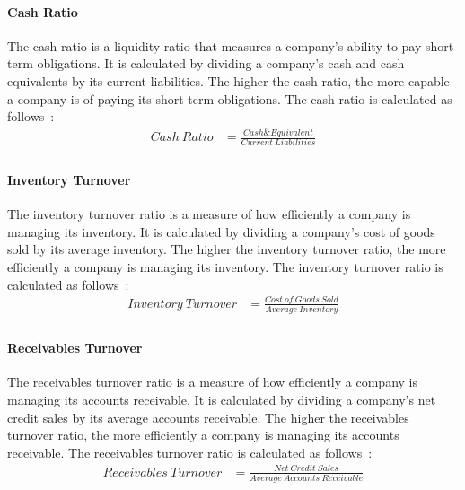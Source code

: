\documentclass[../xlapes02]{subfiles}
\begin{document}
    \paragraph{Cash Ratio}\label{par:cash-ratio}
    The cash ratio is a liquidity ratio that measures a company's ability to pay short-term obligations. It is calculated by dividing a company's cash and cash equivalents by its current liabilities. The higher the cash ratio, the more capable a company is of paying its short-term obligations. The cash ratio is calculated as follows~\cite{investopedia-cash-ratio}:
    \begin{equation}
        \begin{split}
            Cash\ Ratio&=\frac{Cash\&Equivalent}{Current\ Liabilities}\\
        \end{split}
    \end{equation}

    \paragraph{Inventory Turnover}\label{par:inventory-turnover}
    The inventory turnover ratio is a measure of how efficiently a company is managing its inventory. It is calculated by dividing a company's cost of goods sold by its average inventory. The higher the inventory turnover ratio, the more efficiently a company is managing its inventory. The inventory turnover ratio is calculated as follows~\cite{investopedia-inventory-turnover}:
    \begin{equation}
        \begin{split}
            Inventory\ Turnover&=\frac{Cost\ of\ Goods\ Sold}{Average\ Inventory}\\
        \end{split}
    \end{equation}

    \paragraph{Receivables Turnover}\label{par:receivables-turnover}
    The receivables turnover ratio is a measure of how efficiently a company is managing its accounts receivable. It is calculated by dividing a company's net credit sales by its average accounts receivable. The higher the receivables turnover ratio, the more efficiently a company is managing its accounts receivable. The receivables turnover ratio is calculated as follows~\cite{investopedia-recievables-turnover}:
    \begin{equation}
        \begin{split}
            Receivables\ Turnover&=\frac{Net\ Credit\ Sales}{Average\ Accounts\ Receivable}\\
        \end{split}
    \end{equation}
\end{document}
